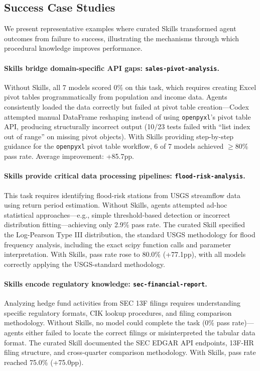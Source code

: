 \subsection{Success Case Studies}
\label{app:success-cases}

We present representative examples where curated Skills transformed agent outcomes from failure to success, illustrating the mechanisms through which procedural knowledge improves performance.

\paragraph{Skills bridge domain-specific API gaps: \texttt{sales-pivot-analysis}.}
Without Skills, all 7 models scored 0\% on this task, which requires creating Excel pivot tables programmatically from population and income data. Agents consistently loaded the data correctly but failed at pivot table creation---Codex attempted manual DataFrame reshaping instead of using \texttt{openpyxl}'s pivot table API, producing structurally incorrect output (10/23 tests failed with ``list index out of range'' on missing pivot objects). With Skills providing step-by-step guidance for the \texttt{openpyxl} pivot table workflow, 6 of 7 models achieved $\geq$80\% pass rate. Average improvement: +85.7pp.

\paragraph{Skills provide critical data processing pipelines: \texttt{flood-risk-analysis}.}
This task requires identifying flood-risk stations from USGS streamflow data using return period estimation. Without Skills, agents attempted ad-hoc statistical approaches---e.g., simple threshold-based detection or incorrect distribution fitting---achieving only 2.9\% pass rate. The curated Skill specified the Log-Pearson Type III distribution, the standard USGS methodology for flood frequency analysis, including the exact scipy function calls and parameter interpretation. With Skills, pass rate rose to 80.0\% (+77.1pp), with all models correctly applying the USGS-standard methodology.

\paragraph{Skills encode regulatory knowledge: \texttt{sec-financial-report}.}
Analyzing hedge fund activities from SEC 13F filings requires understanding specific regulatory formats, CIK lookup procedures, and filing comparison methodology. Without Skills, no model could complete the task (0\% pass rate)---agents either failed to locate the correct filings or misinterpreted the tabular data format. The curated Skill documented the SEC EDGAR API endpoints, 13F-HR filing structure, and cross-quarter comparison methodology. With Skills, pass rate reached 75.0\% (+75.0pp).


